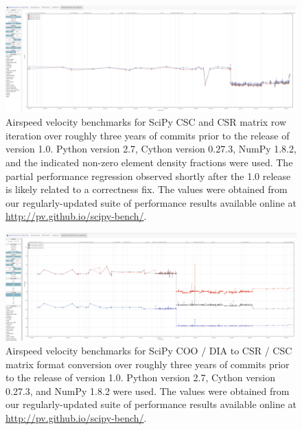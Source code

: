 \documentclass[fleqn,10pt]{wlscirep}
\begin{document}
\begin{figure}[H]
\centering
\includegraphics[width=\textwidth]{supporting_info/asv_bench/sparse/sparse_iteration_bench}
\caption{Airspeed velocity benchmarks for SciPy CSC and CSR matrix row iteration over roughly three years of commits prior to the release of version 1.0. Python version 2.7, Cython version 0.27.3, NumPy 1.8.2, and the indicated non-zero element density fractions were used. The partial performance regression observed shortly after the 1.0 release is likely related to a correctness fix\cite{sparse-regress}. The values were obtained from our regularly-updated suite of performance results available online at \url{http://pv.github.io/scipy-bench/}.}
\label{fig:sparse-iter}
\end{figure}

\begin{figure}[H]
\centering
\includegraphics[width=\textwidth]{supporting_info/asv_bench/sparse/sparse_coo_dia_to_csr_csc}
\caption{Airspeed velocity benchmarks for SciPy COO / DIA to CSR / CSC matrix format conversion over roughly three years of commits prior to the release of version 1.0. Python version 2.7, Cython version 0.27.3, and NumPy 1.8.2 were used. The values were obtained from our regularly-updated suite of performance results available online at \url{http://pv.github.io/scipy-bench/}.}
\label{fig:sparse-conv}
\end{figure}
\end{document}
